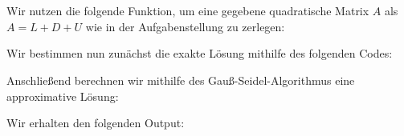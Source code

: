 \section{}

Wir nutzen die folgende Funktion, um eine gegebene quadratische Matrix $A$ als $A = L + D + U$ wie in der Aufgabenstellung zu zerlegen:



Wir bestimmen nun zunächst die exakte Lösung mithilfe des folgenden Codes:



Anschließend berechnen wir mithilfe des Gauß-Seidel-Algorithmus eine approximative Lösung:



Wir erhalten den folgenden Output:

